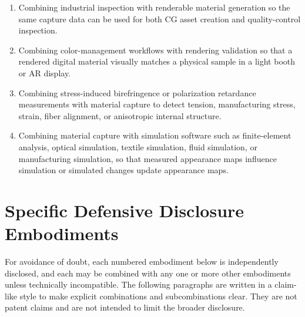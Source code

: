 \documentclass[11pt, twoside, listof=totocnumbered, bibliography=totocnumbered]{scrartcl}
\begin{document}
\begin{enumerate}
		\item Combining industrial inspection with renderable material generation so the same capture data can be used for both CG asset creation and quality-control inspection.
		\item Combining color-management workflows with rendering validation so that a rendered digital material visually matches a physical sample in a light booth or AR display.
		\item Combining stress-induced birefringence or polarization retardance measurements with material capture to detect tension, manufacturing stress, strain, fiber alignment, or anisotropic internal structure.
		\item Combining material capture with simulation software such as finite-element analysis, optical simulation, textile simulation, fluid simulation, or manufacturing simulation, so that measured appearance maps influence simulation or simulated changes update appearance maps.
	\end{enumerate}
	
	\section{Specific Defensive Disclosure Embodiments}
	For avoidance of doubt, each numbered embodiment below is independently disclosed, and each may be combined with any one or more other embodiments unless technically incompatible.
	The following paragraphs are written in a claim-like style to make explicit combinations and subcombinations clear. They are not patent claims and are not intended to limit the broader disclosure.
	
\end{document}
